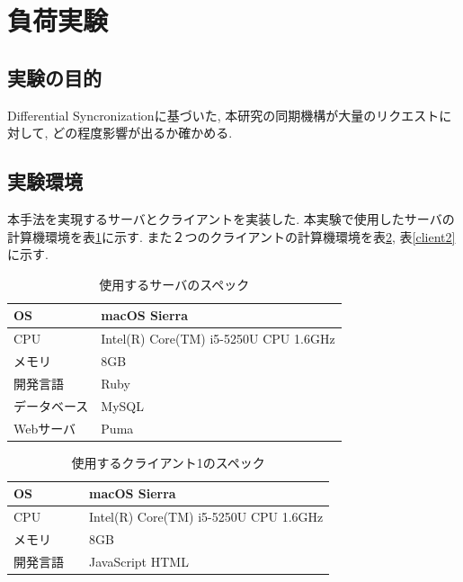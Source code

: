 \section{負荷実験}
\subsection{実験の目的}
Differential Syncronizationに基づいた, 本研究の同期機構が大量のリクエストに対して, どの程度影響が出るか確かめる.
\subsection{実験環境}
本手法を実現するサーバとクライアントを実装した. 本実験で使用したサーバの計算機環境を表\ref{server}に示す. また２つのクライアントの計算機環境を表\ref{client1}, 表\ref{client2}に示す.
\begin{table}[htbp]
\begin{center}
	\caption{使用するサーバのスペック}
	\begin{tabular}{|l|l|} \hline
		OS &  macOS Sierra　\\ \hline
		CPU & Intel(R) Core(TM) i5-5250U CPU 1.6GHz \\ \hline
		メモリ & 8GB \\ \hline
    開発言語　& Ruby \\ \hline
		データベース & MySQL \\ \hline
		Webサーバ & Puma\\ \hline
	\end{tabular}
	\label{server}
\end{center}
\end{table}

\begin{table}[htbp]
\begin{center}
	\caption{使用するクライアント1のスペック}
	\begin{tabular}{|l|l|} \hline
		OS & macOS Sierra \\ \hline
		CPU & Intel(R) Core(TM) i5-5250U CPU 1.6GHz \\ \hline
		メモリ & 8GB \\ \hline
    開発言語　& JavaScript HTML \\ \hline
	\end{tabular}
	\label{client1}
\end{center}
\end{table}

